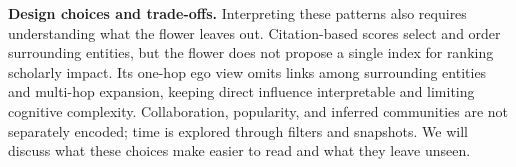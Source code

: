 \documentclass[]{hdsr}
\begin{document}


\textbf{Design choices and trade-offs.}
Interpreting these patterns also requires understanding what the flower leaves out. Citation-based scores select and order surrounding entities, but the flower does not propose a single index for ranking scholarly impact. Its one-hop ego view omits links among surrounding entities and multi-hop expansion, keeping direct influence interpretable and limiting cognitive complexity.
Collaboration, popularity, and inferred communities are not separately encoded; time is explored through filters and snapshots. We will discuss what these choices make easier to read and what they leave unseen.




\end{document}
